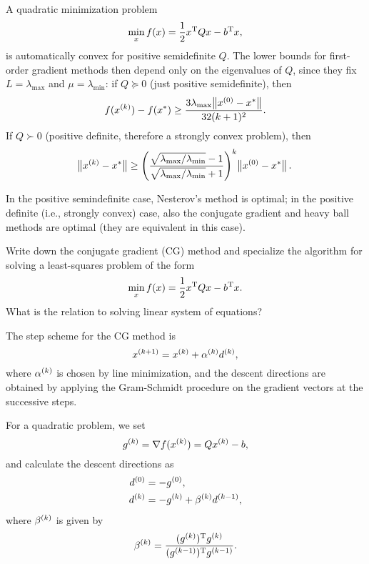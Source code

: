 \documentclass{article}
\begin{document}
A quadratic minimization problem
\begin{equation*}
  \min_x f(x) = \frac{1}{2} \T{x} Q x - \T{b}x,
\end{equation*}
is automatically convex for positive semidefinite \(Q\).  The lower bounds for first-order gradient
methods then depend only on the eigenvalues of \(Q\), since they fix \(L = \lambda_{\text{max}}\)
and \(\mu = \lambda_{\text{min}}\): if \(Q \succeq 0\) (just positive semidefinite), then
\begin{equation*}
  f(\kth{x}) - f(x^*) \geq \frac{3\lambda_{\text{max}} \enVert[1]{\kth[0]{x} - x^*}}{32(k+1)^2}.
\end{equation*}
If \(Q \succ 0\) (positive definite, therefore a strongly convex problem), then
\begin{equation*}
  \enVert[1]{\kth{x} - x^*}
  \geq \left( \frac{\sqrt{\lambda_{\text{max}}/\lambda_{\text{min}}} - 1}{
      \sqrt{\lambda_{\text{max}}/\lambda_{\text{min}}} + 1} \right)^k \enVert[1]{\kth[0]{x} - x^*}.
\end{equation*}

In the positive semindefinite case, Nesterov's method is optimal; in the positive definite (i.e.,
strongly convex) case, also the conjugate gradient and heavy ball methods are optimal (they are
equivalent in this case).

\begin{question}
  Write down the conjugate gradient (CG) method and specialize the algorithm for solving a
  least-squares problem of the form
  \[
    \min_x f(x) = \frac{1}{2} \T{x} Q x - \T{b} x.
  \]
  What is the relation to solving linear system of equations?
\end{question}

The step scheme for the CG method is
\begin{equation*}
  \kth[k+1]{x} = \kth{x} + \kth{\alpha}\kth{d},
\end{equation*}
where \(\kth{\alpha}\) is chosen by line minimization, and the descent directions are obtained by
applying the Gram-Schmidt procedure on the gradient vectors at the successive steps.

For a quadratic problem, we set
\begin{equation*}
  \kth{g} = \nabla f(\kth{x}) = Q \kth{x} - b,
\end{equation*}
and calculate the descent directions as
\begin{align*}
  \kth[0]{d} &= -\kth[0]{g}, \\
  \kth[k]{d} &= -\kth{g} + \kth{\beta}\kth[k-1]{d},
\end{align*}
where \(\kth{\beta}\) is given by
\begin{equation*}
  \kth{\beta} = \frac{\T{(\kth{g})}\kth{g}}{\T{(\kth[k-1]{g})}\kth[k-1]{g}}.
\end{equation*}
\end{document}
